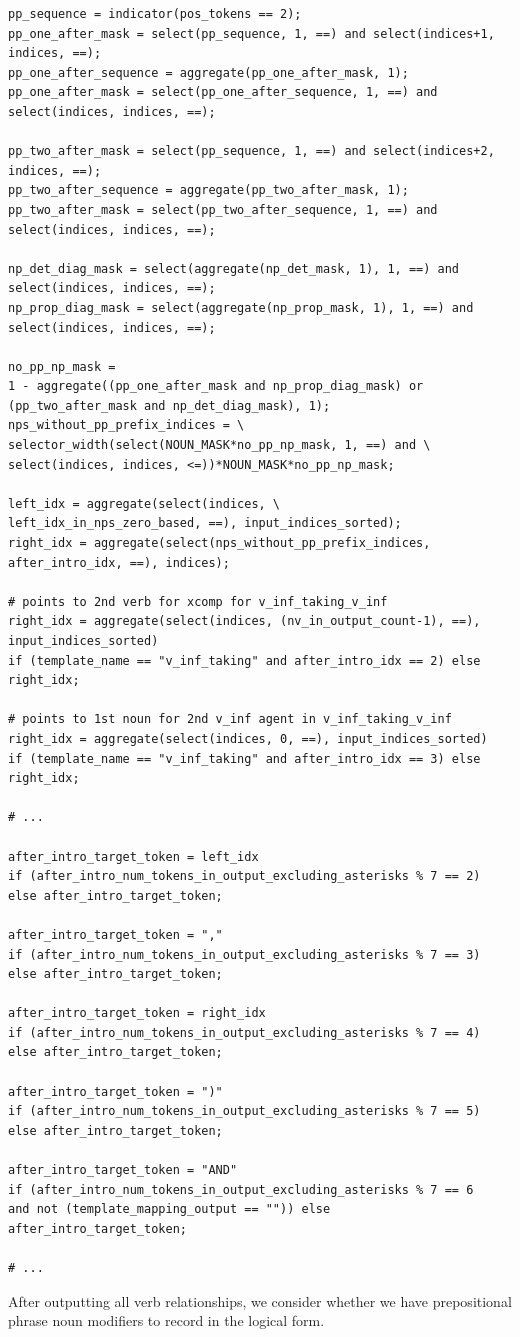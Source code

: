 \documentclass[11pt]{article}
\begin{document}
\begin{tiny}
\begin{verbatim}
pp_sequence = indicator(pos_tokens == 2);
pp_one_after_mask = select(pp_sequence, 1, ==) and select(indices+1, indices, ==);
pp_one_after_sequence = aggregate(pp_one_after_mask, 1);
pp_one_after_mask = select(pp_one_after_sequence, 1, ==) and select(indices, indices, ==);

pp_two_after_mask = select(pp_sequence, 1, ==) and select(indices+2, indices, ==);
pp_two_after_sequence = aggregate(pp_two_after_mask, 1);
pp_two_after_mask = select(pp_two_after_sequence, 1, ==) and select(indices, indices, ==);

np_det_diag_mask = select(aggregate(np_det_mask, 1), 1, ==) and select(indices, indices, ==);
np_prop_diag_mask = select(aggregate(np_prop_mask, 1), 1, ==) and select(indices, indices, ==);

no_pp_np_mask = 
1 - aggregate((pp_one_after_mask and np_prop_diag_mask) or 
(pp_two_after_mask and np_det_diag_mask), 1);
nps_without_pp_prefix_indices = \
selector_width(select(NOUN_MASK*no_pp_np_mask, 1, ==) and \
select(indices, indices, <=))*NOUN_MASK*no_pp_np_mask;

left_idx = aggregate(select(indices, \
left_idx_in_nps_zero_based, ==), input_indices_sorted);
right_idx = aggregate(select(nps_without_pp_prefix_indices, after_intro_idx, ==), indices);

# points to 2nd verb for xcomp for v_inf_taking_v_inf
right_idx = aggregate(select(indices, (nv_in_output_count-1), ==), input_indices_sorted) 
if (template_name == "v_inf_taking" and after_intro_idx == 2) else right_idx;

# points to 1st noun for 2nd v_inf agent in v_inf_taking_v_inf
right_idx = aggregate(select(indices, 0, ==), input_indices_sorted) 
if (template_name == "v_inf_taking" and after_intro_idx == 3) else right_idx;

# ...

after_intro_target_token = left_idx 
if (after_intro_num_tokens_in_output_excluding_asterisks % 7 == 2) else after_intro_target_token;

after_intro_target_token = "," 
if (after_intro_num_tokens_in_output_excluding_asterisks % 7 == 3) else after_intro_target_token;

after_intro_target_token = right_idx 
if (after_intro_num_tokens_in_output_excluding_asterisks % 7 == 4) 
else after_intro_target_token;

after_intro_target_token = ")" 
if (after_intro_num_tokens_in_output_excluding_asterisks % 7 == 5) 
else after_intro_target_token;

after_intro_target_token = "AND" 
if (after_intro_num_tokens_in_output_excluding_asterisks % 7 == 6 
and not (template_mapping_output == "")) else after_intro_target_token;

# ...
\end{verbatim}
\end{tiny}
\clearpage
After outputting all verb relationships, we consider whether we have prepositional phrase noun modifiers to record in the logical form.
\end{document}
